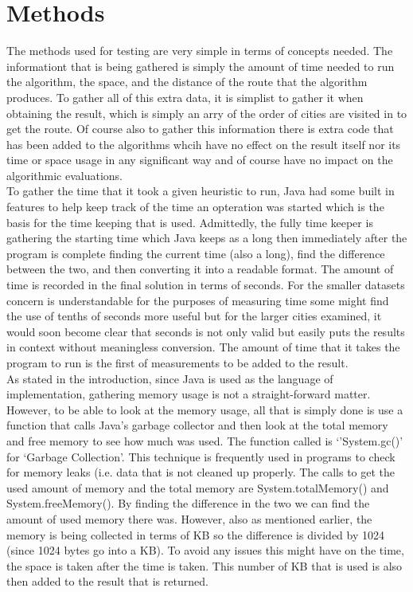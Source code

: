 \documentclass[midd]{thesis}
\newcommand{\tab}{\hspace*{2em}}
\begin{document}
\section{Methods}
\tab The methods used for testing are very simple in terms of concepts needed. The informationt that is being gathered is simply the amount of time needed to run the algorithm, the space, and the distance of the route that the algorithm produces. To gather all of this extra data, it is simplist to gather it when obtaining the result, which is simply an arry of the order of cities are visited in to get the route. Of course also to gather this information there is extra code that has been added to the algorithms whcih have no effect on the result itself nor its time or space usage in any significant way and of course have no impact on the algorithmic evaluations.\\
\tab To gather the time that it took a given heuristic to run, Java had some built in features to help keep track of the time an opteration was started which is the basis for the time keeping that is used. Admittedly, the fully time keeper is gathering the starting time which Java keeps as a long then immediately after the program is complete finding the current time (also a long), find the difference between the two, and then converting it into a readable format. The amount of time is recorded in the final solution in terms of seconds. For the smaller datasets concern is understandable for the purposes of measuring time some might find the use of tenths of seconds more useful but for the larger cities examined, it would soon become clear that seconds is not only valid but easily puts the results in context without meaningless conversion. The amount of time that it takes the program to run is the first of measurements to be added to the result.\\
\tab As stated in the introduction, since Java is used as the language of implementation, gathering memory usage is not a straight-forward matter. However, to be able to look at the memory usage, all that is simply done is use a function that calls Java's garbage collector and then look at the total memory and free memory to see how much was used. The function called is `'System.gc()'  for `Garbage Collection'. This technique is frequently used in programs to check for memory leaks (i.e. data that is not cleaned up properly. The calls to get the used amount of memory and the total memory are System.totalMemory() and System.freeMemory(). By finding the difference in the two we can find the amount of used memory there was. However, also as mentioned earlier, the memory is being collected in terms of KB so the difference is divided by 1024 (since 1024 bytes go into a KB). To avoid any issues this might have on the time, the space is taken after the time is taken. This number of KB that is used is also then added to the result that is returned.\\
\end{document}
